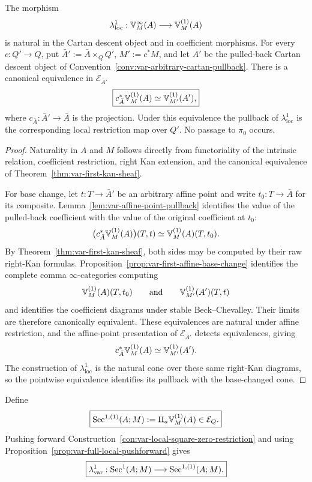 \begin{theorem}
\label{thm:var-first-local-naturality}
The morphism
\[
    \lambda^1_{\mathrm{loc}}:\mathbb V^{\infty}_M(A)\longrightarrow\mathbb V^{(1)}_M(A)
\]
is natural in the Cartan descent object and in coefficient morphisms. For every \(c:Q'\to Q\), put \(\bar A':=\bar A\times_QQ'\), \(M':=c^*M\), and let \(A'\) be the pulled-back Cartan descent object of Convention~\ref{conv:var-arbitrary-cartan-pullback}. There is a canonical equivalence in \(\mathcal E_{\bar A'}\)
\[
    \boxed{
    c_{\bar A}^*\mathbb V^{(1)}_M(A)
    \simeq
    \mathbb V^{(1)}_{M'}(A'),
    }
\]
where \(c_{\bar A}:\bar A'\to\bar A\) is the projection. Under this equivalence the pullback of \(\lambda^1_{\mathrm{loc}}\) is the corresponding local restriction map over \(Q'\). No passage to \(\pi_0\) occurs.
\end{theorem}

\begin{proof}
Naturality in \(A\) and \(M\) follows directly from functoriality of the intrinsic relation, coefficient restriction, right Kan extension, and the canonical equivalence of Theorem~\ref{thm:var-first-kan-sheaf}.

For base change, let \(t:T\to\bar A'\) be an arbitrary affine point and write \(t_0:T\to\bar A\) for its composite. Lemma~\ref{lem:var-affine-point-pullback} identifies the value of the pulled-back coefficient with the value of the original coefficient at \(t_0\):
\[
    \bigl(c_{\bar A}^*\mathbb V^{(1)}_M(A)\bigr)(T,t)
    \simeq
    \mathbb V^{(1)}_M(A)(T,t_0).
\]
By Theorem~\ref{thm:var-first-kan-sheaf}, both sides may be computed by their raw right-Kan formulas. Proposition~\ref{prop:var-first-affine-base-change} identifies the complete comma \(\infty\)-categories computing
\[
    \mathbb V^{(1)}_M(A)(T,t_0)
    \qquad\text{and}\qquad
    \mathbb V^{(1)}_{M'}(A')(T,t)
\]
and identifies the coefficient diagrams under stable Beck--Chevalley. Their limits are therefore canonically equivalent. These equivalences are natural under affine restriction, and the affine-point presentation of \(\mathcal E_{\bar A'}\) detects equivalences, giving
\[
    c_{\bar A}^*\mathbb V^{(1)}_M(A)
    \simeq
    \mathbb V^{(1)}_{M'}(A').
\]
The construction of \(\lambda^1_{\mathrm{loc}}\) is the natural cone over these same right-Kan diagrams, so the pointwise equivalence identifies its pullback with the base-changed cone.
\end{proof}

\begin{definition}
\label{def:var-first-secondary}
Define
\[
    \boxed{
    \operatorname{Sec}^{1,(1)}(A;M)
    :=
    \Pi_a\mathbb V^{(1)}_M(A)
    \in\mathcal E_Q.
    }
\]
Pushing forward Construction~\ref{con:var-local-square-zero-restriction} and using Proposition~\ref{prop:var-full-local-pushforward} gives
\[
    \boxed{
    \lambda^1_{\mathrm{var}}:
    \operatorname{Sec}^1(A;M)
    \longrightarrow
    \operatorname{Sec}^{1,(1)}(A;M).
    }
\]
\end{definition}

